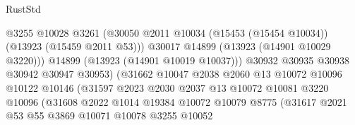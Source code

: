 \begin{lexlean}{RustStd}
\begin{coremodule}
                                          @3255
                                          @10028
                                          @3261
                                          (@30050
                                            @2011
                                            @10034
                                            (@15453 (@15454 @10034))
                                            (@13923 (@15459 @2011 @53)))
                                          @30017
                                          @14899
                                          (@13923 (@14901 @10029 @3220)))
                                        @14899
                                        (@13923 (@14901 @10019 @10037)))
                                      @30932
                                      @30935
                                      @30938
                                      @30942
                                      @30947
                                      @30953)
                                    (@31662
                                      @10047
                                      @2038
                                      @2060
                                      @13
                                      @10072
                                      @10096
                                      @10122
                                      @10146
                                      (@31597
                                        @2023
                                        @2030
                                        @2037
                                        @13
                                        @10072
                                        @10081
                                        @3220
                                        @10096
                                        (@31608
                                          @2022
                                          @1014
                                          @19384
                                          @10072
                                          @10079
                                          @8775
                                          (@31617
                                            @2021
                                            @53
                                            @55
                                            @3869
                                            @10071
                                            @10078
                                            @3255
                                            @10052

\end{coremodule}
\end{lexlean}
